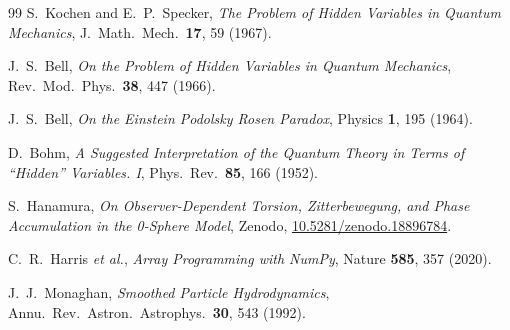 \documentclass[%
 reprint, amsmath,amssymb, aps, prb, ]{revtex4-2}
\numberwithin{equation}{section}
\begin{document}
\begin{thebibliography}{99}
S.~Kochen and E.~P.~Specker,
\emph{The Problem of Hidden Variables in Quantum Mechanics},
J.~Math.\ Mech.\ \textbf{17}, 59 (1967).

J.~S.~Bell,
\emph{On the Problem of Hidden Variables in Quantum Mechanics},
Rev.~Mod.~Phys.\ \textbf{38}, 447 (1966).

J.~S.~Bell,
\emph{On the Einstein Podolsky Rosen Paradox},
Physics \textbf{1}, 195 (1964).

D.~Bohm,
\emph{A Suggested Interpretation of the Quantum Theory in Terms of ``Hidden'' Variables. I},
Phys.~Rev.\ \textbf{85}, 166 (1952).

S.~Hanamura,
\emph{On Observer-Dependent Torsion, Zitterbewegung, and Phase Accumulation in the 0-Sphere Model},
Zenodo, \href{https://doi.org/10.5281/zenodo.18896784}{10.5281/zenodo.18896784}.

C.~R.~Harris \emph{et al.},
\emph{Array Programming with NumPy},
Nature \textbf{585}, 357 (2020).

J.~J.~Monaghan,
\emph{Smoothed Particle Hydrodynamics},
Annu.~Rev.~Astron.~Astrophys.\ \textbf{30}, 543 (1992).

\end{thebibliography}

\end{document}
